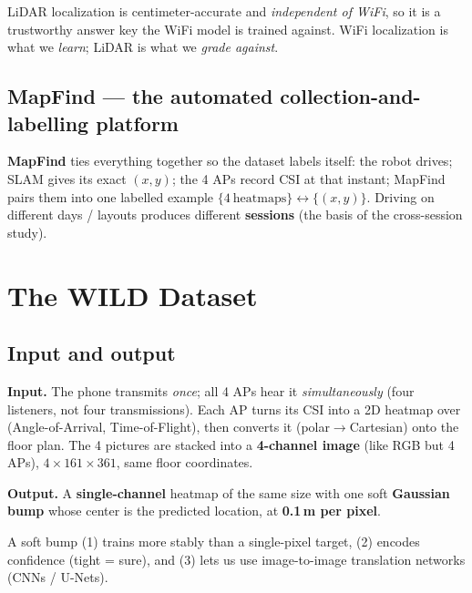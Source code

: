 \documentclass[11pt]{article}
\begin{document}
\begin{keybox}
LiDAR localization is centimeter-accurate and \emph{independent of WiFi}, so it is a trustworthy answer
key the WiFi model is trained against. WiFi localization is what we \emph{learn}; LiDAR is what we
\emph{grade against}.
\end{keybox}

\subsection*{MapFind --- the automated collection-and-labelling platform}
\textbf{MapFind} ties everything together so the dataset labels itself: the robot drives; SLAM gives its
exact $(x,y)$; the 4 APs record CSI at that instant; MapFind pairs them into one labelled example
$\{4~\text{heatmaps}\}\leftrightarrow\{(x,y)\}$. Driving on different days / layouts produces different
\textbf{sessions} (the basis of the cross-session study).

\section{The WILD Dataset}

\subsection*{Input and output}
\textbf{Input.} The phone transmits \emph{once}; all 4 APs hear it \emph{simultaneously} (four listeners,
not four transmissions). Each AP turns its CSI into a 2D heatmap over (Angle-of-Arrival, Time-of-Flight),
then converts it (polar$\to$Cartesian) onto the floor plan. The 4 pictures are stacked into a
\textbf{4-channel image} (like RGB but 4 APs), $4\times161\times361$, same floor coordinates.

\textbf{Output.} A \textbf{single-channel} heatmap of the same size with one soft \textbf{Gaussian bump}
whose center is the predicted location, at \textbf{0.1\,m per pixel}.

\begin{keybox}
A soft bump (1) trains more stably than a single-pixel target, (2) encodes confidence (tight = sure), and
(3) lets us use image-to-image translation networks (CNNs / U-Nets).
\end{keybox}
\end{document}
